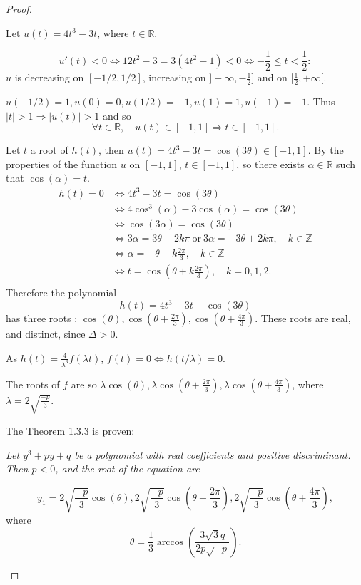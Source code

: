 \documentclass[11pt,a4paper]{article}
\newcommand{\Z}{\mathbb{Z}}
\newcommand{\R}{\mathbb{R}}
\begin{document}
\begin{proof}
\begin{enumerate}
Let $u(t) = 4t^3-3t$, where $t \in \R$.

 $$u'(t) <0 \iff 12t^2-3 = 3(4t^2-1)<0 \iff -\frac{1}{2} \leq t < \frac{1}{2} : $$ 
  $u$ is decreasing on $[-1/2,1/2]$, increasing on $]-\infty,-\frac{1}{2}]$ and on $[\frac{1}{2},+\infty[$.

$u(-1/2) = 1,u(0) = 0, u(1/2)=-1,u(1)=1,u(-1) = -1$. Thus $|t|>1 \Rightarrow |u(t)|>1$ and so
$$\forall t \in \R,\quad   u(t) \in [-1,1] \Rightarrow t \in [-1,1].$$


Let $t$ a root of $h(t)$, then $u(t) = 4t^3 - 3 t = \cos(3\theta) \in [-1,1]$. By the properties of the function $u$ on $[-1,1]$, $t \in [-1,1]$, so there exists $\alpha \in \mathbb{R}$ such that $\cos(\alpha) = t$.
\begin{align*}
h(t) = 0 &\iff 4 t^3 - 3t = \cos(3\theta)\\
&\iff 4 \cos^3(\alpha) - 3 \cos(\alpha) = \cos(3\theta)\\
&\iff \cos(3\alpha) = \cos(3\theta)\\
&\iff 3 \alpha = 3 \theta + 2k \pi \ \mathrm{or} \ 3 \alpha =-  3 \theta + 2k \pi, \quad k\in \mathbb{Z}\\
&\iff \alpha = \pm\theta + k \frac{2\pi}{3}, \quad k \in \Z\\
&\iff t = \cos\left (\theta + k \frac{2\pi}{3}\right),\quad  k = 0,1,2.\\
\end{align*}
Therefore the polynomial $$h(t) = 4t^3 - 3t -\cos(3\theta)$$ has three roots :  $\cos(\theta), \cos(\theta+ \frac{2\pi}{3}),\cos(\theta+ \frac{4\pi}{3})$. These roots are real, and distinct, since $\Delta>0$.

As  $h(t) = \frac{4}{\lambda^3} f(\lambda t) $, $f(t)=0 \iff h(t/\lambda)=0$.

The roots of $f$ are so  $\lambda \cos(\theta), \lambda \cos(\theta+ \frac{2\pi}{3}),\lambda \cos(\theta+ \frac{4\pi}{3})$, where $ \lambda = 2\sqrt{\frac{-p}{3}}$.

The Theorem  1.3.3 is proven:

{\it Let $y^3+py+q$ be a polynomial with real coefficients and positive discriminant. Then $p<0$, and the root of the equation are

$$y_1 = 2\sqrt{\frac{-p}{3}} \cos(\theta),2\sqrt{\frac{-p}{3}} \cos\left(\theta+\frac{2\pi}{3}\right),2\sqrt{\frac{-p}{3}} \cos\left(\theta+\frac{4\pi}{3}\right),$$
where $$ \theta = \frac{1}{3}\arccos\left(\frac{3\sqrt{3}q}{2p\sqrt{-p}} \right).$$
}
\end{enumerate}
\end{proof}
\end{document}
